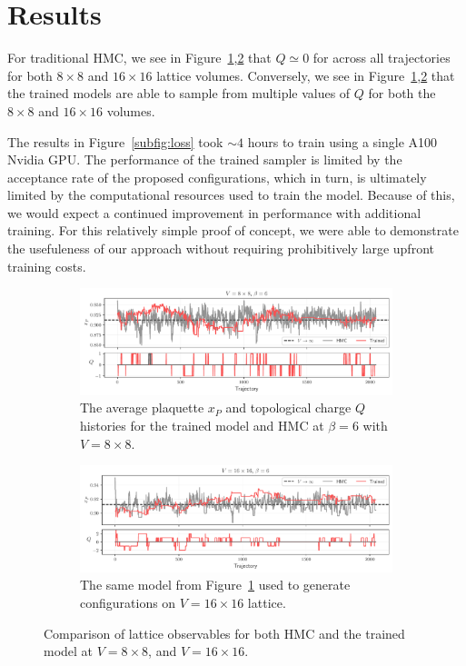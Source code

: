 \documentclass[a4paper,11pt]{article}
\begin{document}
\section{\label{sec:results}Results}
%
For traditional HMC, we see in Figure~\ref{subfig:q8},\ref{subfig:q16}
that \(Q \simeq 0\) for across all trajectories for both \(8\times 8\) and
\(16\times 16\) lattice volumes.
%
Conversely, we see in Figure~\ref{subfig:q8},\ref{subfig:q16} that the trained
models are able to sample from multiple values of \(Q\) for both the \(8\times
8\) and \(16\times16\) volumes.
%

The results in Figure~\ref{subfig:loss} took \(\sim 4\) hours to train using a
single A100 Nvidia GPU.
%
The performance of the trained sampler is limited by the acceptance rate of the
proposed configurations, which in turn, is ultimately limited by the
computational resources used to train the model.
%
Because of this, we would expect a continued improvement in performance with
additional training.
%
For this relatively simple proof of concept, we were able to
demonstrate the usefuleness of our approach without requiring prohibitively
large upfront training costs.
%
\begin{figure}[htpb]
    \centering
    \begin{subfigure}[b]{\linewidth}
        \includegraphics[width=\linewidth]{assets/histories_8x8_beta6.pdf}
        \caption{\label{subfig:q8}The average plaquette \(x_{P}\) and
            topological charge \(Q\) histories for the trained model and
        HMC at \(\beta = 6\) with \(V = 8 \times 8\).}
    \end{subfigure}
    \hfill
    \begin{subfigure}[b]{\linewidth}
        \includegraphics[width=\linewidth]{assets/histories_16x16_beta6_xfr.pdf}
        \caption{\label{subfig:q16}The same model from Figure~\ref{subfig:q8}
        used to generate configurations on \(V = 16\times16\) lattice.}
    \end{subfigure}
    \caption{\label{fig:histories}Comparison of lattice observables for both
        HMC and the trained model at \(V = 8\times 8\), and \(V =
    16\times16\).}
\end{figure}
\end{document}
